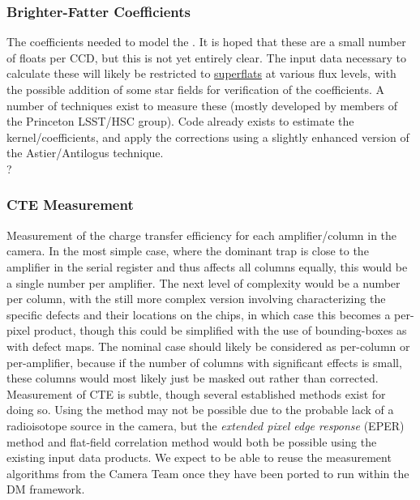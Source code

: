 \subsubsection{Brighter-Fatter Coefficients}\label{sec:CPP:output:brighterFatterCoeffs}
The coefficients needed to model the \bfeffect. It is hoped that these are a small number of floats per CCD, but this is not yet entirely clear. The input data necessary to calculate these will likely be restricted to \hyperref[sec:CPP:inputs:broadFlat]{superflats} at various flux levels, with the possible addition of some star fields for verification of the coefficients.
\alg A number of techniques exist to measure these (mostly developed by members of the Princeton LSST/HSC group). Code already exists to estimate the kernel/coefficients, and apply the corrections using a slightly enhanced version of the Astier/Antilogus technique.
\\ \dragons ?


\subsubsection{CTE Measurement}\label{sec:CPP:output:CTE}
Measurement of the charge transfer efficiency for each amplifier/column in the camera. In the most simple case, where the dominant trap is close to the amplifier in the serial register and thus affects all columns equally, this would be a single number per amplifier. The next level of complexity would be a number per column, with the still more complex version involving characterizing the specific defects and their locations on the chips, in which case this becomes a per-pixel product, though this could be simplified with the use of bounding-boxes as with defect maps. The nominal case should likely be considered as per-column or per-amplifier, because if the number of columns with significant effects is small, these columns would most likely just be masked out rather than corrected.
\alg Measurement of CTE is subtle, though several established methods exist for doing so. Using the \fefiftyfive method may not be possible due to the probable lack of a radioisotope source in the camera, but the \emph{extended pixel edge response} (EPER) method and flat-field correlation method would both be possible using the existing input data products. We expect to be able to reuse the measurement algorithms from the Camera Team once they have been ported to run within the DM framework.


